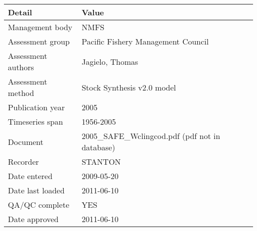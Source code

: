 \begin{table}[htb]
\centering
\begin{tabular}{lp{7cm}}
\toprule
Detail & Value \\
\midrule
Management body    & NMFS                                            \\
Assessment group   & Pacific Fishery Management Council              \\
Assessment authors & Jagielo, Thomas                                 \\
Assessment method  & Stock Synthesis v2.0 model                      \\
Publication year   & 2005                                            \\
Timeseries span    & 1956-2005                                       \\
Document           & 2005\_SAFE\_Wclingcod.pdf (pdf not in database) \\
Recorder           & STANTON                                         \\
Date entered       & 2009-05-20                                      \\
Date last loaded   & 2011-06-10                                      \\
QA/QC complete     & YES                                             \\
Date approved      & 2011-06-10                                      \\
\bottomrule
\end{tabular}
\label{tab:assessdet}
\end{table}
